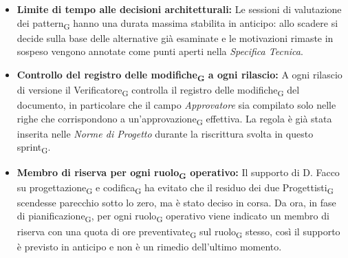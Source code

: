 ﻿\documentclass[a4paper, 10pt, colorlinks=true, linkcolor=black, urlcolor=blue, citecolor=blue, hidelinks]{article}
\begin{document}
\begin{itemize}
    \item \textbf{Limite di tempo alle decisioni architetturali:} Le sessioni di valutazione dei pattern\textsubscript{G} hanno una durata massima stabilita in anticipo: allo scadere si decide sulla base delle alternative già esaminate e le motivazioni rimaste in sospeso vengono annotate come punti aperti nella \textit{Specifica Tecnica}.

    \item \textbf{Controllo del registro delle modifiche\textsubscript{G} a ogni rilascio:} A ogni rilascio di versione il Verificatore\textsubscript{G} controlla il registro delle modifiche\textsubscript{G} del documento, in particolare che il campo \textit{Approvatore} sia compilato solo nelle righe che corrispondono a un'approvazione\textsubscript{G} effettiva. La regola è già stata inserita nelle \textit{Norme di Progetto} durante la riscrittura svolta in questo sprint\textsubscript{G}.

    \item \textbf{Membro di riserva per ogni ruolo\textsubscript{G} operativo:} Il supporto di D. Facco su progettazione\textsubscript{G} e codifica\textsubscript{G} ha evitato che il residuo dei due Progettisti\textsubscript{G} scendesse parecchio sotto lo zero, ma è stato deciso in corsa. Da ora, in fase di pianificazione\textsubscript{G}, per ogni ruolo\textsubscript{G} operativo viene indicato un membro di riserva con una quota di ore preventivate\textsubscript{G} sul ruolo\textsubscript{G} stesso, così il supporto è previsto in anticipo e non è un rimedio dell'ultimo momento.
\end{itemize}
\end{document}
